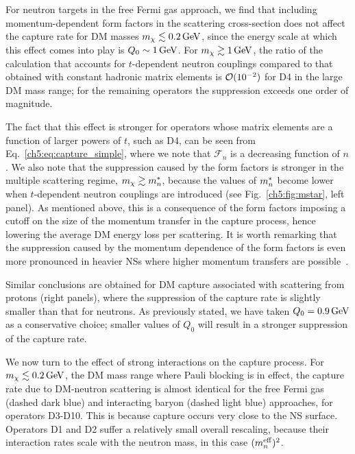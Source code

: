 For neutron targets in the free Fermi gas approach, we find that including momentum-dependent form factors in the scattering cross-section does not affect the capture rate for DM masses $m_\chi\lesssim0.2{\rm \,GeV}$, since the energy scale at which this effect comes into play is $Q_0\sim1{\rm \,GeV}$. For $m_\chi\gtrsim1{\rm \,GeV}$, the ratio of the calculation that accounts for $t$-dependent neutron couplings compared to that obtained with constant hadronic matrix elements is ${\cal O}(10^{-2})$ 
for D4 in the large DM mass range; for the remaining operators the suppression exceeds one order of magnitude.

The fact that this effect is stronger for operators whose matrix elements are a function of larger powers of $t$, such as D4, can be seen from  Eq.~\ref{ch5:eq:capture_simple}, where we note that 
$\mathcal{F}_n$ is a decreasing function of $n$. 
We also note that the suppression caused by the form factors is stronger in the multiple scattering regime, $m_\chi\gtrsim m_n^*$, because the values of $m_n^*$ become lower when $t$-dependent neutron couplings are introduced (see Fig.~\ref{ch5:fig:mstar}, left panel). As mentioned above, this is a consequence of the form factors imposing a cutoff on the 
size of the momentum transfer in the capture process, hence lowering the average DM energy loss per scattering. 
It is worth remarking that the suppression caused by the momentum dependence of the form factors is even more pronounced in heavier NSs where higher momentum transfers are possible~\cite{Bell:2020obw_sep_NucleonStructureStrong}. 

Similar conclusions are obtained for DM capture associated with scattering from protons (right panels), where the suppression of the capture rate is slightly smaller than that for neutrons. 
As previously stated, we have taken $Q_0=0.9{\rm \,GeV}$ as a conservative choice; smaller values of $Q_0$ will result in a stronger suppression of the capture rate. 


We now turn to the effect of strong interactions on the capture process. For $m_\chi\lesssim 0.2{\rm \,GeV}$, the DM mass range where Pauli blocking is in effect, the capture rate due to DM-neutron scattering is almost identical for the free Fermi gas (dashed dark blue) and interacting baryon (dashed light blue) approaches, for operators D3-D10. This is because capture occurs very close to the NS surface. Operators D1 and D2 suffer a relatively small overall rescaling, because their interaction rates scale with the neutron mass, in this case $(m_n^{\rm eff})^2$. 


